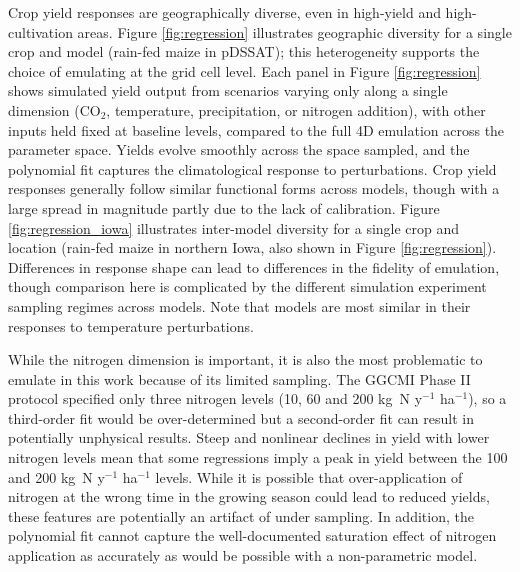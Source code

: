 \documentclass[esd, final]{copernicus} %
\begin{document}
Crop yield responses are geographically diverse, even in high-yield and high-cultivation areas. Figure \ref{fig:regression} illustrates geographic diversity for a single crop and model (rain-fed maize in pDSSAT); this heterogeneity supports the choice of emulating at the grid cell level. Each panel in Figure \ref{fig:regression} shows simulated yield output from scenarios varying only along a single dimension (CO$_2$, temperature, precipitation, or nitrogen addition), with other inputs held fixed at baseline levels, compared to the full 4D emulation across the parameter space. Yields evolve smoothly across the space sampled, and the polynomial fit captures the climatological response to perturbations. Crop yield responses generally follow similar functional forms across models, though with a large spread in magnitude partly due to the lack of calibration. Figure \ref{fig:regression_iowa} illustrates inter-model diversity for a single crop and location (rain-fed maize in northern Iowa, also shown in Figure \ref{fig:regression}). Differences in response shape can lead to  differences in the fidelity of emulation, though comparison here is complicated by the different simulation experiment sampling regimes across models. Note that models are most similar in their responses to temperature perturbations. 

While the nitrogen dimension is important, it is also the most problematic to emulate in this work because of its limited sampling. The GGCMI Phase II protocol specified only three nitrogen levels (10, 60 and 200 kg~N y$^{-1}$ ha$^{-1}$), so a third-order fit would be over-determined but a second-order fit can result in potentially unphysical results. Steep and nonlinear declines in yield with lower nitrogen levels mean that some regressions imply a peak in yield between the 100 and 200 kg~N y$^{-1}$ ha$^{-1}$ levels. While it is possible that over-application of nitrogen at the wrong time in the growing season could lead to reduced yields, these features are potentially an artifact of under sampling. In addition, the polynomial fit cannot capture the well-documented saturation effect of nitrogen application \citep[e.g.][]{Torsten77} as accurately as would be possible with a non-parametric model. 
\end{document}
